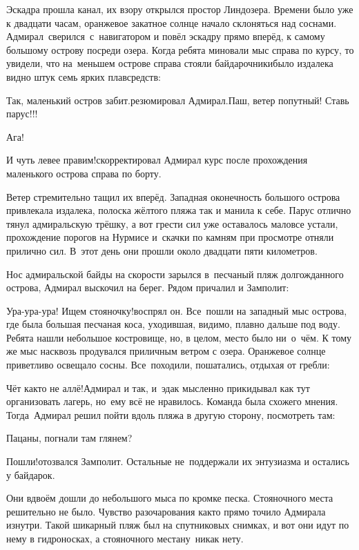 Эскадра прошла канал, их взору открылся простор Линдозера. Времени было уже к двадцати часам, оранжевое закатное солнце начало склоняться над соснами. Адмирал~сверился~с~навигатором и повёл эскадру прямо вперёд, к самому большому острову посреди озера. Когда ребята миновали мыс справа по курсу, то увидели, что на~меньшем острове справа стояли байдарочники\mdash было издалека видно штук семь ярких плавсредств:

\diagdash Так, маленький остров забит.\mdash резюмировал Адмирал.\mdash Паш, ветер попутный! Ставь парус!!!

\diagdash Ага!

\diagdash И чуть левее правим!\mdash скорректировал Адмирал курс после прохождения маленького острова справа по борту.

Ветер стремительно тащил их вперёд. Западная оконечность большого острова привлекала издалека, полоска жёлтого пляжа так и манила к себе. Парус отлично тянул адмиральскую трёшку, а вот грести сил уже оставалось мало\mdash все устали, прохождение порогов на Нурмисе и~скачки по камням при просмотре отняли прилично сил. В~этот день они прошли около двадцати пяти километров.

Нос адмиральской байды на скорости зарылся в~песчаный пляж долгожданного острова, Адмирал выскочил на берег. Рядом причалил и Замполит:

\diagdash Ура-ура-ура! Ищем стояночку!\mdash воспрял он. Все~пошли на западный мыс острова, где была большая песчаная коса, уходившая, видимо, плавно дальше под воду. Ребята нашли небольшое костровище, но, в целом, место было ни~о~чём. К тому же мыс насквозь продувался приличным ветром с озера. Оранжевое солнце приветливо освещало сосны. Все~походили, пошатались, отдыхая от гребли:

\diagdash Чёт как\sdash то не аллё!\mdash Адмирал и так, и~эдак мысленно прикидывал как тут организовать лагерь, но~ему всё не нравилось. Команда была схожего мнения. Тогда~Адмирал решил пойти вдоль пляжа в другую сторону, посмотреть там:

\diagdash Пацаны, погнали там глянем?

\diagdash Пошли!\mdash отозвался Замполит. Остальные не~поддержали их энтузиазма и остались у байдарок.

Они вдвоём дошли до небольшого мыса по кромке песка. Стояночного места решительно не было. Чувство разочарования как\sdash то прямо точило Адмирала изнутри. Такой шикарный пляж был на спутниковых снимках, и вот они идут по нему в гидроносках, а стояночного места\mdash ну~никак нету.

